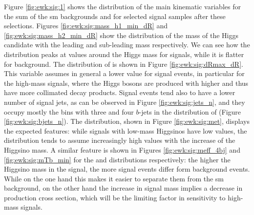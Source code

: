 Figure \ref{fig:ewk:sig:1} shows the distribution of the main kinematic variables for 
the sum of the \gls{sm} backgrounds and for selected signal samples after these selections.
Figures \ref{fig:ewk:sig:mass_h1_min_dR} and \ref{fig:ewk:sig:mass_h2_min_dR} show the distribution of the mass of the Higgs 
candidate with the leading and sub-leading mass respectively. We can see how the distribution peaks at values around the Higgs mass for 
signals, while it is flatter for background. 
The distribution of \dRmax is shown in Figure \ref{fig:ewk:sig:dRmax_dR}. This variable assumes in general a lower value for 
signal events, in particular for the high-mass signals, where the Higgs bosons are produced with higher \pt and thus have 
more collimated decay products. Signal events tend also to have a lower number of signal jets, as can be observed in Figure 
\ref{fig:ewk:sig:jets_n}, and they occupy mostly the bins with three and four $b$-jets in the 
distribution of \nbjet (Figure \ref{fig:ewk:sig:bjets_n}). 
The \met distribution, shown in Figure \ref{fig:ewk:sig:met}, displays the expected features: while signals with low-mass Higgsinos 
have low \met values, the distribution tends to assume increasingly high values with the increase of the Higgsino mass. 
A similar feature is shown in Figures \ref{fig:ewk:sig:meff_4bj} and \ref{fig:ewk:sig:mTb_min} for the \meffb and \mtb distributions respectively: 
the higher the Higgsino mass in the signal, the more signal events differ form background events. 
While on the one hand this makes it easier to separate them from the \gls{sm} background, on the other hand the increase in signal mass 
implies a decrease in production cross section, which will be the limiting factor in sensitivity to high-mass signals. 


